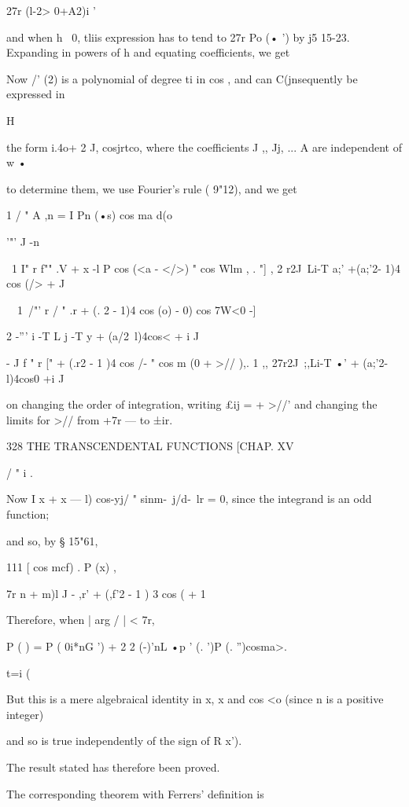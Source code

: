 {{{27r 
(l-2> 0+A2)i ' 

and when h~ 0, tliis expression has to tend to 27r Po (• ') by j5 15-23. Expanding in powers 
of h and equating coefficients, we get 

Now /' (2) is a polynomial of degree ti in cos , and can C(jnsequently be expressed in 

H 

the form i.4o+ 2 J, cosjrtco, where the coefficients J ,, Jj, ... A  are independent of w • 

to determine them, we use Fourier's rule (  9"12), and we get 

1 / "  
A ,n = I Pn (•s) cos ma d(o 

'"' J -n 

\  1 I" r f""  .V +  x -l P cos (<a - </>) " cos Wlm , . "] , 
2 r2J\  Li-T  a;' +(a;'2- 1)4 cos (/>   +   J 

\ \ 1\  /"'  r / "  .r + (. 2 - 1)4 cos (o) - 0)   cos 7W<0 -] 

2 -''' i -T L j -T  y + (a/2\ l)4cos<    + i J 

- J  f " r ["     + (.r2 - 1 )4 cos  /- " cos m (0 + >// ),. 1 ,, 
27r2J\ ;,Li-T   •' + (a;'2-l)4cos0  +i J 

on changing the order of integration, writing £ij = + >//' and changing the limits for >//  
from +7r —   to ±ir. 



328 THE TRANSCENDENTAL FUNCTIONS [CHAP. XV 

/ " i . 

Now I  x +  x  — l)  cos-yj/ "  sinm-\ j/d-\ lr = 0, since the integrand is an odd function; 

and so, by § 15"61, 

111 [  cos mcf) . P  (x) , 

7r n + m)l J -   ,r' + (,f'2 - 1 ) 3 cos (    + 1 

Therefore, when | arg / | < 7r, 

P ( ) = P ( 0i*nG ') + 2 2 (-)'nL •p ' (. ')P  (. '')cosma>. 

 t=i (%

But this is a mere algebraical identity in x, x and cos <o (since n is a positive integer) 

and so is true independently of the sign of R  x'). 

The result stated has therefore been proved. 

The corresponding theorem with Ferrers' definition is 

}}}
